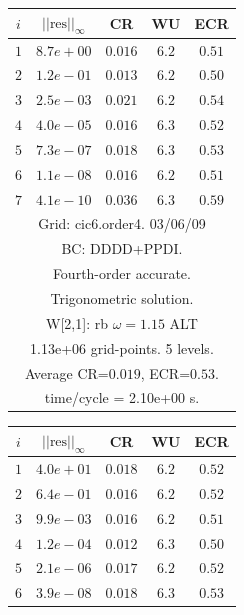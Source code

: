 \begin{table}[hbt]
\begin{center}
{\tablefontsize
\begin{tabular}{|c|c|c|c|c|} \hline 
 $i$   & $\vert\vert\mbox{res}\vert\vert_\infty$  &  CR     &  WU    & ECR  \\   \hline 
 $ 1$  & $ 8.7e+00$ & $0.016$ & $ 6.2$ & $0.51$ \\ 
 $ 2$  & $ 1.2e-01$ & $0.013$ & $ 6.2$ & $0.50$ \\ 
 $ 3$  & $ 2.5e-03$ & $0.021$ & $ 6.2$ & $0.54$ \\ 
 $ 4$  & $ 4.0e-05$ & $0.016$ & $ 6.3$ & $0.52$ \\ 
 $ 5$  & $ 7.3e-07$ & $0.018$ & $ 6.3$ & $0.53$ \\ 
 $ 6$  & $ 1.1e-08$ & $0.016$ & $ 6.2$ & $0.51$ \\ 
 $ 7$  & $ 4.1e-10$ & $0.036$ & $ 6.3$ & $0.59$ \\ 
\hline 
\multicolumn{5}{|c|}{Grid: cic6.order4. 03/06/09}  \\
\multicolumn{5}{|c|}{BC: DDDD+PPDI.}  \\
\multicolumn{5}{|c|}{Fourth-order accurate.}  \\
\multicolumn{5}{|c|}{Trigonometric solution.}  \\
\multicolumn{5}{|c|}{W[2,1]: rb $\omega=1.15$ ALT}  \\
\multicolumn{5}{|c|}{1.13e+06 grid-points. 5 levels.}  \\
\multicolumn{5}{|c|}{Average CR=$0.019$, ECR=$0.53$.}  \\
\multicolumn{5}{|c|}{time/cycle = 2.10e+00 s.}  \\
\hline 
\end{tabular}
\begin{tabular}{|c|c|c|c|c|} \hline 
 $i$   & $\vert\vert\mbox{res}\vert\vert_\infty$  &  CR     &  WU    & ECR  \\   \hline 
 $ 1$  & $ 4.0e+01$ & $0.018$ & $ 6.2$ & $0.52$ \\ 
 $ 2$  & $ 6.4e-01$ & $0.016$ & $ 6.2$ & $0.52$ \\ 
 $ 3$  & $ 9.9e-03$ & $0.016$ & $ 6.2$ & $0.51$ \\ 
 $ 4$  & $ 1.2e-04$ & $0.012$ & $ 6.3$ & $0.50$ \\ 
 $ 5$  & $ 2.1e-06$ & $0.017$ & $ 6.2$ & $0.52$ \\ 
 $ 6$  & $ 3.9e-08$ & $0.018$ & $ 6.3$ & $0.53$ \\ 

\end{tabular}}
\end{center}
\end{table}
